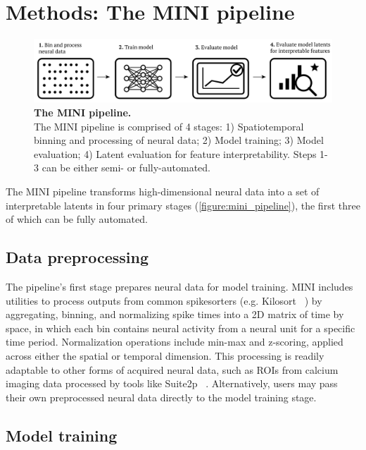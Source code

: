 \section{Methods: The MINI pipeline}

\begin{figure}[h]
    \centering
    \includegraphics[width=\linewidth]{figures/mini_pipeline.pdf}
    \caption{
        \textbf{The MINI pipeline.} \\
        \small The MINI pipeline is comprised of 4 stages: 1) Spatiotemporal binning and processing of neural data; 2) Model training; 3) Model evaluation; 4) Latent evaluation for feature interpretability. Steps 1-3 can be either semi- or fully-automated.
    }
    \label{figure:mini_pipeline}
\end{figure}

The MINI pipeline transforms high-dimensional neural data into a set of interpretable latents in four primary stages (\autoref{figure:mini_pipeline}), the first three of which can be fully automated.

\subsection{Data preprocessing}

The pipeline's first stage prepares neural data for model training. MINI includes utilities to process outputs from common spikesorters (e.g. Kilosort ~\cite{pachitariu_2016_kilosort}) by aggregating, binning, and normalizing spike times into a 2D matrix of time by space, in which each bin contains neural activity from a neural unit for a specific time period. Normalization operations include min-max and z-scoring, applied across either the spatial or temporal dimension. This processing is readily adaptable to other forms of acquired neural data, such as ROIs from calcium imaging data processed by tools like Suite2p ~\cite{pachitariu_2017_suite2p}. Alternatively, users may pass their own preprocessed neural data directly to the model training stage.

\subsection{Model training}

